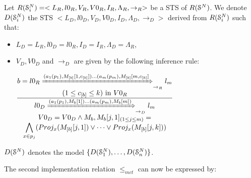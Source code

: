 

\begin{definition}
    Let $R(\EuScript{S}_i^{N})=<L_R,l0_R,V_R,V0_R,I_R,\Lambda_R,\rightarrow_R>$ be a STS of $R(\EuScript{S}^{N})$. We denote $D(\EuScript{S}_i^{N})$ the STS $ <L_D,l0_D,V_D,V0_D,I_D,\Lambda_D,\rightarrow_D>$ derived from $R(\EuScript{S}_i^{N})$ such that:
\begin{itemize}
    \item $L_D=L_{R}, l0_D=l0_{R}, I_D=I_{R}, \Lambda_D=\Lambda_{R}$,
    \item $V_D, V0_D$ and $\rightarrow_D$ are given by the following inference rule:

				$\frac{
					\begin{matrix}
					b=l0_{R}
					\xRightarrow{(a_1(p_1),M_{[b]}[1,c_{[b]}])\dots (a_m(p_m),M_{[b]}[m,c_{[b]}]}_{\rightarrow_{R}}
					l_{m}\\
					(1 \leq c_{[b]} \leq k) \text{ in } V0_{R}
					\end{matrix}
				}
				{
					\begin{matrix}
					l0_D
					\xRightarrow{(a_1(p_1),M_b[1])\dots (a_m(p_m),M_b[m])}_{\rightarrow_D}
					l_m\\
					V0_D=V0_D \wedge M_b, M_b[j, 1]_{(1\leq j \leq m)} =\\
					 \displaystyle \bigwedge_{x \in p_j} ( Proj_x(M_{[b]}[j, 1]) \vee \dots \vee Proj_x(M_{[b]}[j, k]))



					\end{matrix}
				}$
  \end{itemize}

    $D(\EuScript{S}^{N})$ denotes the model $\{D(\EuScript{S}_1^{N}),\dots,D(\EuScript{S}_n^{N}) \}$.
\end{definition}


The second implementation relation $\leq_{mct}$ can now be
expressed by:

